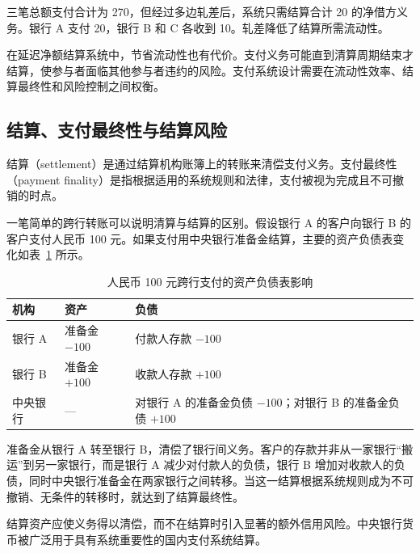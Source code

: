 三笔总额支付合计为 270，但经过多边轧差后，系统只需结算合计 20 的净借方义务。银行 A 支付 20，银行 B 和 C 各收到 10。轧差降低了结算所需流动性。

在延迟净额结算系统中，节省流动性也有代价。支付义务可能直到清算周期结束才结算，使参与者面临其他参与者违约的风险。支付系统设计需要在流动性效率、结算最终性和风险控制之间权衡。

\subsection{结算、支付最终性与结算风险}

结算（settlement）是通过结算机构账簿上的转账来清偿支付义务。支付最终性（payment finality）是指根据适用的系统规则和法律，支付被视为完成且不可撤销的时点。

一笔简单的跨行转账可以说明清算与结算的区别。假设银行 A 的客户向银行 B 的客户支付人民币 100 元。如果支付用中央银行准备金结算，主要的资产负债表变化如表~\ref{tab:ch2-cross-bank-payment} 所示。

\begin{table}[H]
\centering
\caption{人民币 100 元跨行支付的资产负债表影响}
\label{tab:ch2-cross-bank-payment}

\renewcommand{\arraystretch}{1.2}

\begin{tabularx}{\textwidth}{
    @{}
    >{\raggedright\arraybackslash}p{3.0cm}
    >{\raggedright\arraybackslash}X
    >{\raggedright\arraybackslash}X
    @{}
}
\toprule
\textbf{机构}
& \textbf{资产}
& \textbf{负债} \\
\midrule

银行 A
& 准备金 $-100$
& 付款人存款 $-100$ \\

银行 B
& 准备金 $+100$
& 收款人存款 $+100$ \\

中央银行
& ---
& 对银行 A 的准备金负债 $-100$；对银行 B 的准备金负债 $+100$ \\

\bottomrule
\end{tabularx}
\end{table}

准备金从银行 A 转至银行 B，清偿了银行间义务。客户的存款并非从一家银行“搬运”到另一家银行，而是银行 A 减少对付款人的负债，银行 B 增加对收款人的负债，同时中央银行准备金在两家银行之间转移。当这一结算根据系统规则成为不可撤销、无条件的转移时，就达到了结算最终性。

结算资产应使义务得以清偿，而不在结算时引入显著的额外信用风险。中央银行货币被广泛用于具有系统重要性的国内支付系统结算。

